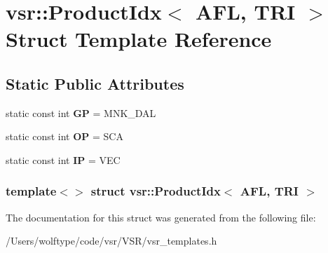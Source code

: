 \hypertarget{structvsr_1_1_product_idx_3_01_a_f_l_00_01_t_r_i_01_4}{\section{vsr\-:\-:Product\-Idx$<$ A\-F\-L, T\-R\-I $>$ Struct Template Reference}
\label{structvsr_1_1_product_idx_3_01_a_f_l_00_01_t_r_i_01_4}
}
\subsection*{Static Public Attributes}
\begin{DoxyCompactItemize}
\item 
\hypertarget{structvsr_1_1_product_idx_3_01_a_f_l_00_01_t_r_i_01_4_a3d9bdc50bed2a9de1b50772369c4a8b3}{static const int {\bfseries G\-P} = M\-N\-K\-\_\-\-D\-A\-L}\label{structvsr_1_1_product_idx_3_01_a_f_l_00_01_t_r_i_01_4_a3d9bdc50bed2a9de1b50772369c4a8b3}

\item 
\hypertarget{structvsr_1_1_product_idx_3_01_a_f_l_00_01_t_r_i_01_4_a7dcf2994ca8fc20e9aa10347c7fca1da}{static const int {\bfseries O\-P} = S\-C\-A}\label{structvsr_1_1_product_idx_3_01_a_f_l_00_01_t_r_i_01_4_a7dcf2994ca8fc20e9aa10347c7fca1da}

\item 
\hypertarget{structvsr_1_1_product_idx_3_01_a_f_l_00_01_t_r_i_01_4_a4742e6360be51291fde9fa8967e92a71}{static const int {\bfseries I\-P} = V\-E\-C}\label{structvsr_1_1_product_idx_3_01_a_f_l_00_01_t_r_i_01_4_a4742e6360be51291fde9fa8967e92a71}

\end{DoxyCompactItemize}
\subsubsection*{template$<$$>$ struct vsr\-::\-Product\-Idx$<$ A\-F\-L, T\-R\-I $>$}



The documentation for this struct was generated from the following file\-:\begin{DoxyCompactItemize}
\item 
/\-Users/wolftype/code/vsr/\-V\-S\-R/vsr\-\_\-templates.\-h\end{DoxyCompactItemize}
